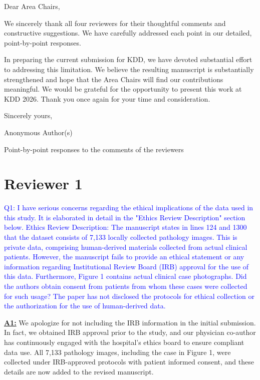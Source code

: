 \documentclass[UTF8,12pt]{article}
\begin{document}

\noindent Dear Area Chairs,

We sincerely thank all four reviewers for their thoughtful comments and constructive suggestions. We have carefully addressed each point in our detailed, point-by-point responses.

In preparing the current submission for KDD, we have devoted substantial effort to addressing this limitation. We believe the resulting manuscript is substantially strengthened and hope that the Area Chairs will find our contributions meaningful. We would be grateful for the opportunity to present this work at KDD 2026. Thank you once again for your time and consideration.


\noindent Sincerely yours,

\noindent Anonymous Author(s)

\newpage
{\Large \centerline{Point-by-point responses to the comments of the reviewers}}



\section*{Reviewer 1}

\textcolor{blue}{Q1: I have serious concerns regarding the ethical implications of the data used in this study. It is elaborated in detail in the "Ethics Review Description" section below. Ethics Review Description: The manuscript states in lines 124 and 1300 that the dataset consists of 7,133 locally collected pathology images. This is private data, comprising human-derived materials collected from actual clinical patients. However, the manuscript fails to provide an ethical statement or any information regarding Institutional Review Board (IRB) approval for the use of this data. Furthermore, Figure 1 contains actual clinical case photographs. Did the authors obtain consent from patients from whom these cases were collected for such usage? The paper has not disclosed the protocols for ethical collection or the authorization for the use of human-derived data. }

\underline{{\bf A1:}} We apologize for not including the IRB information in the initial submission. In fact, we obtained IRB approval prior to the study, and our physician co-author has continuously engaged with the hospital's ethics board to ensure compliant data use. All 7,133 pathology images, including the case in Figure 1, were collected under IRB-approved protocols with patient informed consent, and these details are now added to the revised manuscript.
\end{document}
